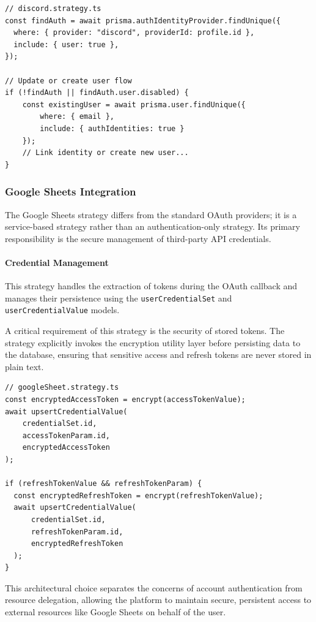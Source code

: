 \begin{lstlisting}[caption={Common OAuth identity logic (Discord Strategy)}]
// discord.strategy.ts
const findAuth = await prisma.authIdentityProvider.findUnique({
  where: { provider: "discord", providerId: profile.id },
  include: { user: true },
});

// Update or create user flow
if (!findAuth || findAuth.user.disabled) {
    const existingUser = await prisma.user.findUnique({ 
        where: { email }, 
        include: { authIdentities: true } 
    });
    // Link identity or create new user...
}
\end{lstlisting}

\subsubsection{Google Sheets Integration}
The Google Sheets strategy differs from the standard OAuth providers; it is a service-based strategy rather than an authentication-only strategy. Its primary responsibility is the secure management of third-party API credentials.

\paragraph{Credential Management}
This strategy handles the extraction of tokens during the OAuth callback and manages their persistence using the \texttt{userCredentialSet} and \texttt{userCredentialValue} models.

A critical requirement of this strategy is the security of stored tokens. The strategy explicitly invokes the encryption utility layer before persisting data to the database, ensuring that sensitive access and refresh tokens are never stored in plain text.

\begin{lstlisting}[caption={Credential encryption and storage flow}]
// googleSheet.strategy.ts
const encryptedAccessToken = encrypt(accessTokenValue);
await upsertCredentialValue(
    credentialSet.id, 
    accessTokenParam.id, 
    encryptedAccessToken
);

if (refreshTokenValue && refreshTokenParam) {
  const encryptedRefreshToken = encrypt(refreshTokenValue);
  await upsertCredentialValue(
      credentialSet.id, 
      refreshTokenParam.id, 
      encryptedRefreshToken
  );
}
\end{lstlisting}

This architectural choice separates the concerns of account authentication from resource delegation, allowing the platform to maintain secure, persistent access to external resources like Google Sheets on behalf of the user.

